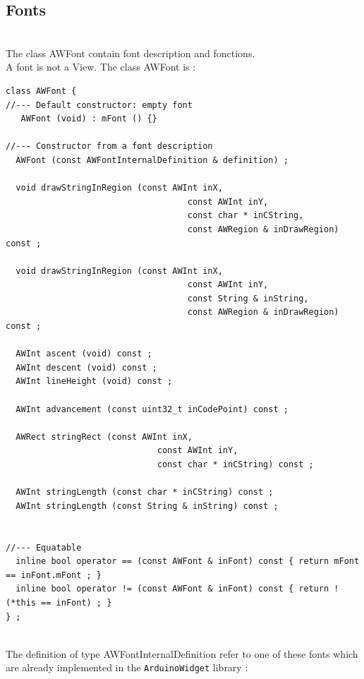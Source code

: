 \documentclass[a4paper,11pt]{extarticle}
\begin{document}
\newpage
\subsection{Fonts}

~\\ The class AWFont contain font description and fonctions.
~\\ A font is not a View. The class AWFont is :

\begin{lstlisting}[language=Arduinonl]
class AWFont {
//--- Default constructor: empty font
   AWFont (void) : mFont () {}

//--- Constructor from a font description
  AWFont (const AWFontInternalDefinition & definition) ;

  void drawStringInRegion (const AWInt inX,
                                    const AWInt inY,
                                    const char * inCString,
                                    const AWRegion & inDrawRegion) const ;

  void drawStringInRegion (const AWInt inX,
                                    const AWInt inY,
                                    const String & inString,
                                    const AWRegion & inDrawRegion) const ;

  AWInt ascent (void) const ;
  AWInt descent (void) const ;
  AWInt lineHeight (void) const ;

  AWInt advancement (const uint32_t inCodePoint) const ;

  AWRect stringRect (const AWInt inX,
                              const AWInt inY,
                              const char * inCString) const ;

  AWInt stringLength (const char * inCString) const ;
  AWInt stringLength (const String & inString) const ;


//--- Equatable
  inline bool operator == (const AWFont & inFont) const { return mFont == inFont.mFont ; }
  inline bool operator != (const AWFont & inFont) const { return !(*this == inFont) ; }
} ;
\end{lstlisting}

~\\ The definition of type AWFontInternalDefinition refer to one of these fonts which are already implemented in the \texttt{ArduinoWidget} library :
\end{document}
